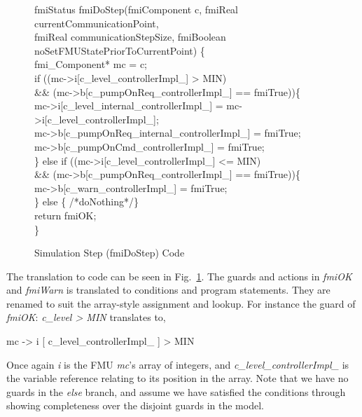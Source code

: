 \documentclass{llncs}%
\begin{document}
%
\begin{figure}
\centering
\begin{minipage}{\textwidth}
fmiStatus fmiDoStep(fmiComponent c, fmiReal currentCommunicationPoint,\\
\hspace*{1.0cm}fmiReal communicationStepSize, fmiBoolean noSetFMUStatePriorToCurrentPoint) \{\\
\hspace*{0.4cm}fmi\_Component* mc = c;\\
\hspace*{0.4cm}if ((mc->i[c\_level\_controllerImpl\_] > MIN)\\
\hspace*{1.0cm} \&\& (mc->b[c\_pumpOnReq\_controllerImpl\_] == fmiTrue))\{\\
\hspace*{0.8cm}mc->i[c\_level\_internal\_controllerImpl\_] = 	mc->i[c\_level\_controllerImpl\_];\\
\hspace*{0.8cm}mc->b[c\_pumpOnReq\_internal\_controllerImpl\_] = fmiTrue;\\
\hspace*{0.8cm}mc->b[c\_pumpOnCmd\_controllerImpl\_] = fmiTrue;\\
\hspace*{0.4cm}\} else if ((mc->i[c\_level\_controllerImpl\_] <= MIN)\\
\hspace*{1.0cm} \&\& (mc->b[c\_pumpOnReq\_controllerImpl\_] == fmiTrue))\{\\
\hspace*{0.8cm}mc->b[c\_warn\_controllerImpl\_] = fmiTrue;\\
\hspace*{0.4cm}\} else \{ /*doNothing*/\}\\
\hspace*{0.4cm}return fmiOK;\\
\}
\end{minipage}
\caption{Simulation Step (fmiDoStep) Code}
\label{fig:fmiDoStepCode}
\end{figure}

The translation to code can be seen in Fig.~\ref{fig:fmiDoStepCode}. The guards and actions in \emph{fmiOK} and \emph{fmiWarn} is translated to conditions and program statements. They are renamed to suit the array-style assignment and lookup. For instance the guard of \emph{fmiOK}: \emph{c\_level > MIN} translates to, 

\vspace*{-0.15cm}
\begin{minipage}{\textwidth}
\centering
mc -> i [ c\_level\_controllerImpl\_ ] > MIN
\end{minipage}
%
Once again \emph{i} is the FMU \emph{mc}'s array of integers, and \emph{c\_level\_controllerImpl\_} is the variable reference relating to its position in the array. Note that we have no guards in the \emph{else} branch, and assume we have satisfied the conditions through showing completeness over the disjoint guards in the model.
\end{document}
